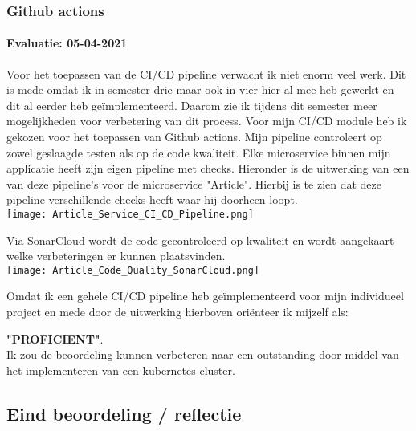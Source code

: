 \subsubsection{Github actions}
\paragraph{Evaluatie: 05-04-2021}
Voor het toepassen van de CI/CD pipeline verwacht ik niet enorm veel werk.
Dit is mede omdat ik in semester drie maar ook in vier hier al mee heb gewerkt en dit al eerder heb geïmplementeerd.
Daarom zie ik tijdens dit semester meer mogelijkheden voor verbetering van dit process.
Voor mijn CI/CD module heb ik gekozen voor het toepassen van Github actions.
Mijn pipeline controleert op zowel geslaagde testen als op de code kwaliteit.
Elke microservice binnen mijn applicatie heeft zijn eigen pipeline met checks.
Hieronder is de uitwerking van een van deze pipeline's voor de microservice "Article".
Hierbij is te zien dat deze pipeline verschillende checks heeft waar hij doorheen loopt.\\

\texttt{[image: Article\_Service\_CI\_CD\_Pipeline.png]}\label{fig:figure}


Via SonarCloud wordt de code gecontroleerd op kwaliteit en wordt aangekaart welke verbeteringen er kunnen plaatsvinden.\\

\texttt{[image: Article\_Code\_Quality\_SonarCloud.png]}\label{fig:figure2}


Omdat ik een gehele CI/CD pipeline heb geïmplementeerd voor mijn individueel project en mede door de uitwerking hierboven oriënteer ik mijzelf als:
\par\vspace{10pt}\textbf{\uppercase{"Proficient"}}.\\

Ik zou de beoordeling kunnen verbeteren naar een outstanding door middel van het implementeren van een kubernetes cluster.

\subsection{Eind beoordeling / reflectie}

